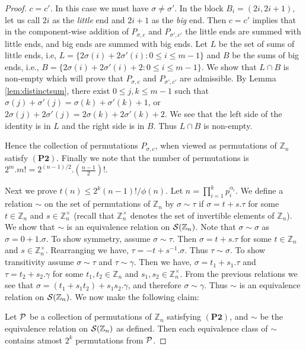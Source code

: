 \documentclass[12pt]{article}
\newcommand{\Zn}{\mathbb{Z}_n}
\newcommand{\mb}{\mathbb}
\newcommand{\PsZn}{{\cal S}(\Zn)}
\begin{document}
\begin{proof}
 $c=c'$. In this case we must have $\sigma\neq
\sigma'$. In the block $B_i=(2i,2i+1)$, let us call $2i$ as the {\em
little}
end and $2i+1$ as the {\em big} end. Then $c=c'$ implies that in the
component-wise addition of $P_{\sigma,c}$ and $P_{\sigma',c'}$ the little
ends are summed with little ends, and big ends are summed with big ends.
Let $L$ be the set of sums of little ends, i.e,
$L=\{2\sigma(i)+2\sigma'(i): 0\leq i\leq m-1\}$ and $B$ be the sums of big
ends, i.e., $B=\{2\sigma(i)+2\sigma'(i)+2: 0\leq i\leq m-1\}$. We show that
$L\cap B$ is non-empty which will prove that $P_{\sigma,c}$ and
$P_{\sigma',c'}$ are admissible. By Lemma \ref{lem:distinctsum}, there
exist $0\leq j,k\leq m-1$ such that $\sigma(j)+\sigma'(j) =
\sigma(k)+\sigma'(k)+1$, or
$2\sigma(j)+2\sigma'(j)=2\sigma(k)+2\sigma'(k)+2$. We see that the left
side of the identity is in $L$ and the right side is in $B$. Thus $L\cap B$
is non-empty. \smallskip

Hence the collection of permutations $P_{\sigma,c}$, when viewed as
permutations of $\mb{Z}_n$ satisfy $\mathbf{(P2)}$. Finally we note that
the number of permutations is $2^m.m!=2^{(n-1)/2}.(\frac{n-1}{2})!$. \medskip

Next we prove $t(n)\leq
2^k(n-1)!/\phi(n)$. Let $n=\prod_{i=1}^k p_i^{\alpha_i}$. We define a relation $\sim$ on the set of permutations of
$\mb{Z}_n$ by $\sigma \sim \tau$ if $\sigma = t + s.\tau$ for some $t\in
\mb{Z}_n$ and $s\in \mb{Z}_n^{\times}$ (recall that $\mb{Z}_n^{\times}$
denotes the set of invertible elements of $\mb{Z}_n$). We show that $\sim$ is an
equivalence relation on $\PsZn$. Note that $\sigma\sim \sigma$ as
$\sigma=0+1.\sigma$. To show symmetry, assume $\sigma\sim \tau$. Then
$\sigma = t+s.\tau$ for some $t\in \mb{Z}_n$ and $s\in \mb{Z}_n^\times$.
Rearranging we have, $\tau = -t + s^{-1}.\sigma$. Thus $\tau\sim\sigma$. To
show transitivity assume $\sigma\sim\tau$ and $\tau\sim \gamma$. Then we
have, $\sigma=t_1+s_1.\tau$ and $\tau=t_2+s_2.\gamma$ for some $t_1,t_2\in
\mb{Z}_n$ and $s_1,s_2\in \mb{Z}_n^{\times}$. From the previous relations
we see that $\sigma=(t_1+s_1t_2)+s_1s_2.\gamma$, and therefore
$\sigma\sim\gamma$. Thus $\sim$ is an equivalence relation on $\PsZn$. We
now make the following claim:\medskip

 Let ${\cal P}$ be a collection of permutations of
$\mb{Z}_n$ satisfying $\mathbf{(P2)}$, and $\sim$ be the equivalence
relation on $\PsZn$ as defined. Then each equivalence class of $\sim$
contains atmost $2^k$ permutations from ${\cal P}$.


\end{proof}
\end{document}
